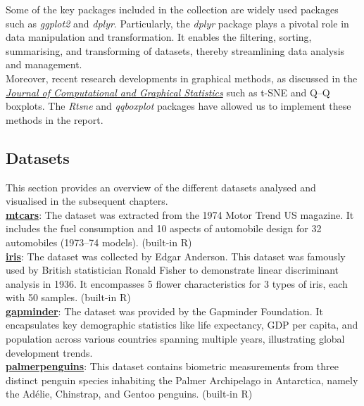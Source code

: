 \documentclass{article}\usepackage[]{graphicx}\usepackage[]{xcolor}
\numberwithin{equation}{section}
\begin{document}
\noindent Some of the key packages included in the collection are widely used packages such as \textit{ggplot2} and \textit{dplyr}. Particularly, the \textit{dplyr} package plays a pivotal role in data manipulation and transformation. It enables the filtering, sorting, summarising, and transforming of datasets, thereby streamlining data analysis and management.\\

\noindent Moreover, recent research developments in graphical methods, as discussed in the \href{https://www.tandfonline.com/journals/ucgs20}{\textit{Journal of Computational and Graphical Statistics}} such as t-SNE and Q–Q boxplots. The \textit{Rtsne} and \textit{qqboxplot} packages have allowed us to implement these methods in the report.

\newpage
\subsection{Datasets}
\noindent
This section provides an overview of the different datasets analysed and visualised in the subsequent chapters.\\

\noindent
\href{https://www.rdocumentation.org/packages/datasets/versions/3.6.2/topics/mtcars}{\textbf{mtcars}}: The dataset was extracted from the 1974 Motor Trend US magazine. It includes the fuel consumption and 10 aspects of automobile design for 32 automobiles (1973–74 models). \hfill (built-in R) \\

\noindent
\href{https://www.rdocumentation.org/packages/datasets/versions/3.6.2/topics/iris}{\textbf{iris}}: The dataset was collected by Edgar Anderson. This dataset was famously used by British statistician Ronald Fisher to demonstrate linear discriminant analysis in 1936. It encompasses 5 flower characteristics for 3 types of iris, each with 50 samples. \hfill (built-in R)\\

\noindent 
\href{https://www.gapminder.org/data/documentation/gd001/}{\textbf{gapminder}}: The dataset was provided by the Gapminder Foundation. It encapsulates key demographic statistics like life expectancy, GDP per capita, and population across various countries spanning multiple years, illustrating global development trends.\\

\noindent
\href{https://www.rdocumentation.org/packages/palmerpenguins/versions/0.1.1}{\textbf{palmerpenguins}}: This dataset contains biometric measurements from three distinct penguin species inhabiting the Palmer Archipelago in Antarctica, namely the Adélie, Chinstrap, and Gentoo penguins. \hfill (built-in R)\\
\end{document}
